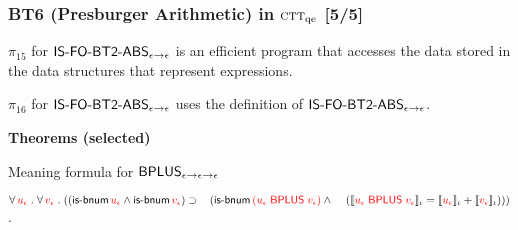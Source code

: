 \documentclass[t,12pt,numbers,fleqn]{beamer}
\newcommand{\churchqe}{$\mbox{\sc ctt}_{\rm qe}$}
\newcommand{\syn}[1]{\textcolor{red}{#1}}
\begin{document}

\begin{frame}
\frametitle{BT6 (Presburger Arithmetic) in {\churchqe} [5/5]}
\small
\vspace{-2ex}
\bi

  \item[]

  \be

    \setcounter{enumi}{14}

    \item $\pi_{15}$ for $\mbox{\sf IS-FO-BT2-ABS}_{\epsilon \rightarrow
      \epsilon}$ is an efficient program that accesses the data stored
      in the data structures that represent expressions.

    \item $\pi_{16}$ for $\mbox{\sf IS-FO-BT2-ABS}_{\epsilon \rightarrow
      \epsilon}$ uses the definition of
      $\mbox{\sf IS-FO-BT2-ABS}_{\epsilon \rightarrow \epsilon}$.

  \ee

  \item[] \textbf{Theorems (selected)}

    \be

      \setcounter{enumi}{2}

      \item Meaning formula for 
      $\mbox{\sf BPLUS}_{\epsilon \rightarrow \epsilon \rightarrow \epsilon}$

      $\ForallApp \syn{u_\epsilon} \mdot \ForallApp \syn{v_\epsilon} \mdot
      ((\mname{is-bnum} \, \syn{u_\epsilon} \Andd \mname{is-bnum} \, \syn{v_\epsilon}) 
      \Implies {}\newline
      \hspace*{2ex}(\mname{is-bnum} \, 
      \syn{(u_\epsilon \; \mname{BPLUS} \; v_\epsilon)} \Andd {}\newline
      \hspace*{2.6ex}(\sembrack{\syn{u_\epsilon \; \mname{BPLUS} \; 
      v_\epsilon}}_\iota = 
      \sembrack{\syn{u_\epsilon}}_\iota + \sembrack{\syn{v_\epsilon}}_\iota)))$.

    \ee

\ei
\end{frame}
\end{document}
